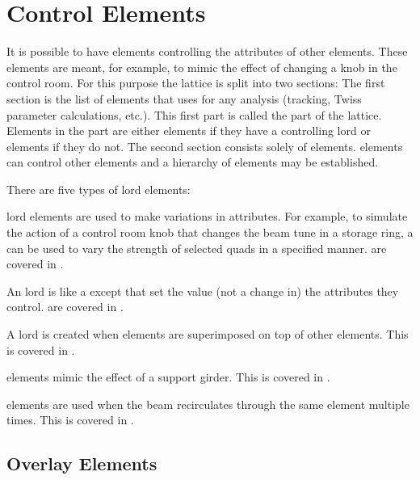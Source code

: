 \chapter {Control Elements}
\label{c:control}

It is possible to have elements controlling the attributes of other
elements. These  elements are meant, for example, to mimic
the effect of changing a knob in the control room. For this purpose
the lattice is split into two sections: The first section is the list
of elements that \bmad uses for any analysis (tracking, Twiss
parameter calculations, etc.). This first part is called the
 part of the lattice.
Elements in the  part are either
 elements if they have a controlling lord or 
elements if they do not.  The second section consists solely of
 elements.  elements can control other 
elements and a hierarchy of  elements may be established.

There are five types of lord elements: 
\begin{Itemize}
\item 
{}
 lord elements are used to make variations in
attributes. For example, to simulate the action of a control room knob
that changes the beam tune in a storage ring, a  can be used
to vary the strength of selected quads in a specified
manner.  are covered in .
\item
{}
An  lord is like a  except that 
set the value (not a change in) the attributes they
control.  are covered in .
\item
A  lord is created when elements are superimposed on
top of other elements. This is covered in .
\item
{}
 elements mimic the effect of a support girder. This is
covered in .
\item
{}
 elements are used when the beam recirculates through
the same element multiple times. This is covered in
.
\end{Itemize}

\section{Overlay Elements}
\label{s:overlay}

